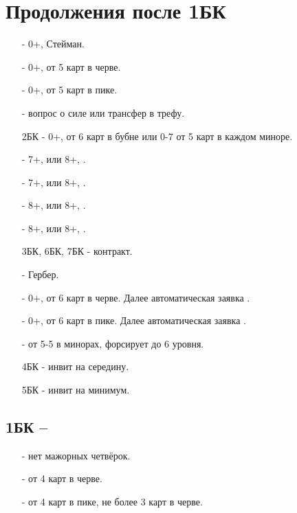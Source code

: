 \documentclass{article}
\begin{document}
\section{Продолжения после 1БК}
\begin{enumerate}
    \item[\cl{2}] - 0+, Стейман.
    \item[\di{2}] - 0+, от 5 карт в черве.
    \item[\he{2}] - 0+, от 5 карт в пике.
    \item[\sp{2}] - вопрос о силе или трансфер в трефу.
    \item[2БК] - 0+, от 6 карт в бубне или 0-7 от 5 карт в каждом миноре.
    \item[\cl{3}] - 7+,  или 8+, .
    \item[\di{3}] - 7+,  или 8+, .
    \item[\he{3}] - 8+,  или 8+, .
    \item[\sp{3}] - 8+,  или 8+, .
    \item[3БК, 6БК, 7БК] - контракт.
    \item[\cl{4}] - Гербер.
    \item[\di{4}] - 0+, от 6 карт в черве. Далее автоматическая заявка .
    \item[\he{4}] - 0+, от 6 карт в пике. Далее автоматическая заявка .
    \item[\sp{4}] - от 5-5 в минорах, форсирует до 6 уровня.
    \item[4БК] - инвит на середину.
    \item[5БК] - инвит на минимум.
\end{enumerate}
\subsection{1БК -- }
\begin{enumerate}
    \item[\di{2}] - нет мажорных четвёрок.
    \item[\he{2}] - от 4 карт в черве.
    \item[\sp{2}] - от 4 карт в пике, не более 3 карт в черве.
\end{enumerate}
\end{document}
